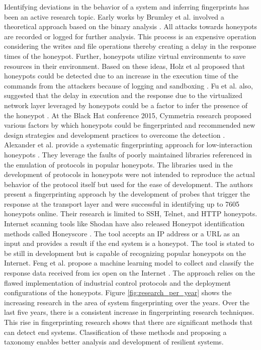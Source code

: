 Identifying deviations in the behavior of a system and inferring fingerprints has been an active research topic. Early works by Brumley et al.  involved a theoretical approach based on the binary analysis \cite{Brumley}. All attacks towards honeypots are recorded or logged for further analysis. This process is an expensive operation considering the writes and file operations thereby creating a delay in the response times of the honeypot. Further, honeypots utilize virtual environments to save resources in their environment. Based on these ideas, Holz et al  proposed that honeypots could be detected due to an increase in the execution time of the commands from the attackers because of logging and sandboxing \cite{Holz}. Fu et al.  also, suggested that the delay in execution and the response due to the virtualized network layer leveraged by honeypots could be a factor to infer the presence of the honeypot \cite{Fu}. At the Black Hat conference 2015, Cymmetria research  proposed various factors by which honeypots could be fingerprinted and recommended new design strategies and development practices to overcome the detection \cite{BLACKHAT}. Alexander et al.  provide a systematic fingerprinting approach for low-interaction honeypots \cite{Vetterl2018}. They leverage the faults of poorly maintained libraries referenced in the emulation of protocols in popular honeypots. The libraries used in the development of protocols in honeypots were not intended to reproduce the actual behavior of the protocol itself but used for the ease of development. The authors present a fingerprinting approach by the development of probes that trigger the response at the transport layer and were successful in identifying up to 7605 honeypots online. Their research is limited to SSH, Telnet, and HTTP honeypots. Internet scanning tools like Shodan have also released Honeypot identification methods called Honeyscore \cite{SHODAN}. The tool accepts an IP address or a URL as an input and provides a result if the end system is a honeypot. The tool is stated to be still in development but is capable of recognizing popular honeypots on the Internet. Feng et al.  propose a machine learning model to collect and classify the response data received from \acrlong{ics} open on the Internet \cite{Feng2016}. The approach relies on the flawed implementation of industrial control protocols and the deployment configurations of the honeypots. Figure \ref{fig:research_per_year} shows the increasing research in the area of system fingerprinting over the years. Over the last five years, there is a consistent increase in fingerprinting research techniques. This rise in fingerprinting research shows that there are significant methods that can detect end systems. Classification of these methods and proposing a taxonomy enables better analysis and development of resilient systems. 

